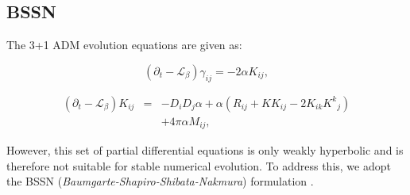 \documentclass[%
 reprint,
 amsmath,amssymb,
 aps,
 prd,
]{revtex4-2}
\begin{document}
%
%
%
%
%
%
%

\subsection{BSSN}

The 3+1 ADM evolution equations are given as:

\begin{equation}
	(\partial_t - \mathcal{L}_\beta)\gamma_{ij} = -2\alpha K_{ij},
\end{equation}

\begin{eqnarray}
	(\partial_t - \mathcal{L}_\beta)K_{ij} &=& -D_i D_j \alpha + \alpha (R_{ij} + KK_{ij}-2K_{ik}K^k{}_{j})\nonumber\\&&+4\pi \alpha M_{ij},
\end{eqnarray}

However, this set of partial differential equations is only weakly hyperbolic and is therefore not suitable for stable numerical evolution. To address this, we adopt the BSSN (\textit{Baumgarte-Shapiro-Shibata-Nakmura}) formulation \cite{Nakamura:1987,  Shibata:1995we, Baumgarte:1998te}.
\end{document}
